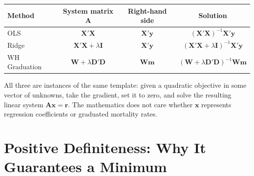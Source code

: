 \documentclass[11pt,a4paper]{article}
\begin{document}
\begin{application}
\begin{center}
\renewcommand{\arraystretch}{1.5}
\begin{tabular}{l c c c}
\toprule
\textbf{Method} & \textbf{System matrix $\bm{A}$} & \textbf{Right-hand side} & \textbf{Solution} \\
\midrule
OLS & $\bm{X}'\bm{X}$ & $\bm{X}'\bm{y}$ & $(\bm{X}'\bm{X})^{-1}\bm{X}'\bm{y}$ \\
Ridge & $\bm{X}'\bm{X} + \lambda\bm{I}$ & $\bm{X}'\bm{y}$ & $(\bm{X}'\bm{X}+\lambda\bm{I})^{-1}\bm{X}'\bm{y}$ \\
WH Graduation & $\bm{W} + \lambda\bm{D}'\bm{D}$ & $\bm{W}\bm{m}$ & $(\bm{W}+\lambda\bm{D}'\bm{D})^{-1}\bm{W}\bm{m}$ \\
\bottomrule
\end{tabular}
\end{center}

\medskip
All three are instances of the same template: given a quadratic objective in some vector of unknowns, take the gradient, set it to zero, and solve the resulting linear system $\bm{A}\bm{x} = \bm{r}$. The mathematics does not care whether $\bm{x}$ represents regression coefficients or graduated mortality rates.
\end{application}

\section{Positive Definiteness: Why It Guarantees a Minimum}
\end{document}
